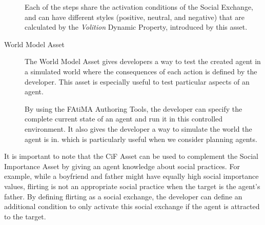 \begin{description}
Each of the steps share the activation conditions of the Social Exchange, and can have different styles (positive, neutral, and negative) that are calculated by the \textit{Volition} Dynamic Property, introduced by this asset.

\item [World Model Asset] \hfill

The World Model Asset gives developers a way to test the created agent in a simulated world where the consequences of each action is defined by the developer.
This asset is especially useful to test particular aspects of an agent.

By using the \ac{FAtiMA} Authoring Tools, the developer can specify the complete current state of an agent and run it in this controlled environment.
It also gives the developer a way to simulate the world the agent is in. which is particularly useful when we consider planning agents.

\end{description}

It is important to note that the \ac{CiF} Asset can be used to complement the Social Importance Asset by giving an agent knowledge about social practices.
For example, while a boyfriend and father might have equally high social importance values, flirting is not an appropriate social practice when the target is the agent's father.
By defining flirting as a social exchange, the developer can define an additional condition to only activate this social exchange if the agent is attracted to the target.





